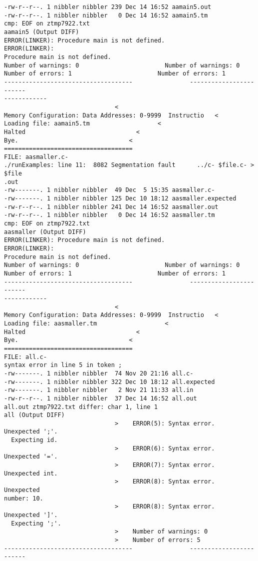 \documentclass[12pt]{book}
\begin{document}
\begin{lstlisting}
-rw-r--r--. 1 nibbler nibbler 239 Dec 14 16:52 aamain5.out
-rw-r--r--. 1 nibbler nibbler   0 Dec 14 16:52 aamain5.tm
cmp: EOF on ztmp7922.txt
aamain5 (Output DIFF)
ERROR(LINKER): Procedure main is not defined.            ERROR(LINKER): 
Procedure main is not defined.
Number of warnings: 0                        Number of warnings: 0
Number of errors: 1                        Number of errors: 1
------------------------------------                ------------------------
------------
                               <
Memory Configuration: Data Addresses: 0-9999  Instructio   <
Loading file: aamain5.tm                   <
Halted                               <
Bye.                               <
====================================
FILE: aasmaller.c-
./runExamples: line 11:  8082 Segmentation fault      ../c- $file.c- > $file
.out
-rw-------. 1 nibbler nibbler  49 Dec  5 15:35 aasmaller.c-
-rw-------. 1 nibbler nibbler 125 Dec 10 18:12 aasmaller.expected
-rw-r--r--. 1 nibbler nibbler 241 Dec 14 16:52 aasmaller.out
-rw-r--r--. 1 nibbler nibbler   0 Dec 14 16:52 aasmaller.tm
cmp: EOF on ztmp7922.txt
aasmaller (Output DIFF)
ERROR(LINKER): Procedure main is not defined.            ERROR(LINKER): 
Procedure main is not defined.
Number of warnings: 0                        Number of warnings: 0
Number of errors: 1                        Number of errors: 1
------------------------------------                ------------------------
------------
                               <
Memory Configuration: Data Addresses: 0-9999  Instructio   <
Loading file: aasmaller.tm                   <
Halted                               <
Bye.                               <
====================================
FILE: all.c-
syntax error in line 5 in token ;
-rw-------. 1 nibbler nibbler  74 Nov 20 21:16 all.c-
-rw-------. 1 nibbler nibbler 322 Dec 10 18:12 all.expected
-rw-------. 1 nibbler nibbler   2 Nov 21 11:33 all.in
-rw-r--r--. 1 nibbler nibbler  37 Dec 14 16:52 all.out
all.out ztmp7922.txt differ: char 1, line 1
all (Output DIFF)
                               >    ERROR(5): Syntax error.  Unexpected ';'.
  Expecting id.
                               >    ERROR(6): Syntax error.  Unexpected '='.
                               >    ERROR(7): Syntax error.  Unexpected int.
                               >    ERROR(8): Syntax error.  Unexpected 
number: 10.
                               >    ERROR(8): Syntax error.  Unexpected ']'.
  Expecting ';'.
                               >    Number of warnings: 0
                               >    Number of errors: 5
------------------------------------                ------------------------

\end{lstlisting}
\end{document}

